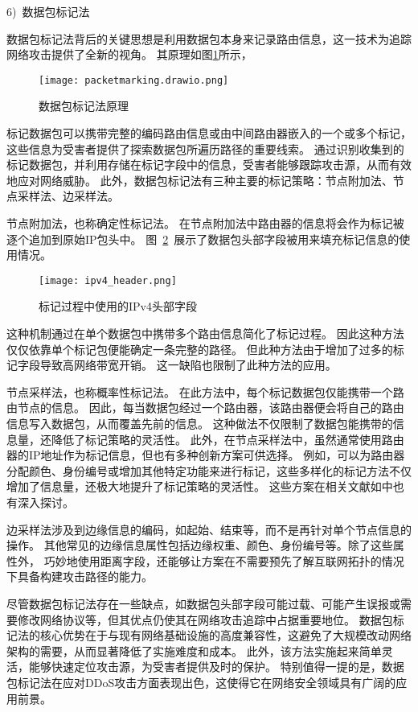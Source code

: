 6)~数据包标记法\par
数据包标记法背后的关键思想是利用数据包本身来记录路由信息，这一技术为追踪网络攻击提供了全新的视角。
其原理如图\ref{fig:packet_marking}所示，
\begin{figure}[h]
  \centering
  \texttt{[image: packetmarking.drawio.png]}
  \caption{数据包标记法原理}
  \label{fig:packet_marking}
\end{figure}
标记数据包可以携带完整的编码路由信息或由中间路由器嵌入的一个或多个标记，这些信息为受害者提供了探索数据包所遍历路径的重要线索。
通过识别收集到的标记数据包，并利用存储在标记字段中的信息，受害者能够跟踪攻击源，从而有效地应对网络威胁。
此外，数据包标记法有三种主要的标记策略：节点附加法、节点采样法、边采样法\cite{fazio2020packet}。

节点附加法，也称确定性标记法。
在节点附加法中路由器的信息将会作为标记被逐个追加到原始IP包头中\cite{suresh2021sanguine,Nur2021Abdullah}。
图~\ref{fig:ipv4_header}~展示了数据包头部字段被用来填充标记信息的使用情况。
\begin{figure}[h]
  \centering
  \texttt{[image: ipv4\_header.png]}
  \caption{标记过程中使用的IPv4头部字段}
  \label{fig:ipv4_header}
\end{figure}
这种机制通过在单个数据包中携带多个路由信息简化了标记过程。
因此这种方法仅仅依靠单个标记包便能确定一条完整的路径。
但此种方法由于增加了过多的标记字段导致高网络带宽开销。
这一缺陷也限制了此种方法的应用。\par

节点采样法，也称概率性标记法。
在此方法中，每个标记数据包仅能携带一个路由节点的信息。
因此，每当数据包经过一个路由器，该路由器便会将自己的路由信息写入数据包，从而覆盖先前的信息。
这种做法不仅限制了数据包能携带的信息量，还降低了标记策略的灵活性。
此外，在节点采样法中，虽然通常使用路由器的IP地址作为标记信息，但也有多种创新方案可供选择。
例如，可以为路由器分配颜色、身份编号或增加其他特定功能来进行标记，这些多样化的标记方法不仅增加了信息量，还极大地提升了标记策略的灵活性。
这些方案在相关文献如\cite{Zhou2019Linna,Wu2018Bo}中也有深入探讨。\par

边采样法涉及到边缘信息的编码，如起始、结束等，而不是再针对单个节点信息的操作。
其他常见的边缘信息属性包括边缘权重、颜色、身份编号等。除了这些属性外，
巧妙地使用距离字段，还能够让方案在不需要预先了解互联网拓扑的情况下具备构建攻击路径的能力。\par

尽管数据包标记法存在一些缺点，如数据包头部字段可能过载、可能产生误报或需要修改网络协议等，但其优点仍使其在网络攻击追踪中占据重要地位。
数据包标记法的核心优势在于与现有网络基础设施的高度兼容性，这避免了大规模改动网络架构的需要，从而显著降低了实施难度和成本。
此外，该方法实施起来简单灵活，能够快速定位攻击源，为受害者提供及时的保护。
特别值得一提的是，数据包标记法在应对DDoS攻击方面表现出色，这使得它在网络安全领域具有广阔的应用前景。\par

